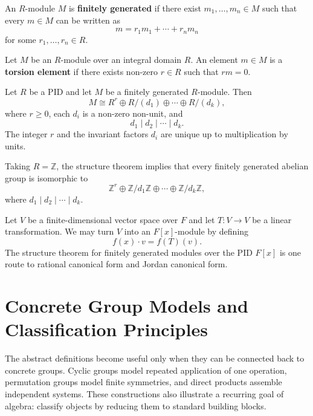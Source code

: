 \begin{definition}
An $R$-module $M$ is \textbf{finitely generated} if there exist $m_1,\dots,m_n\in M$ such that every $m\in M$ can be written as
\[
    m=r_1m_1+\cdots+r_nm_n
\]
for some $r_1,\dots,r_n\in R$.
\end{definition}

\begin{definition}
Let $M$ be an $R$-module over an integral domain $R$. An element $m\in M$ is a \textbf{torsion element} if there exists non-zero $r\in R$ such that $rm=0$.
\end{definition}

\begin{theorem}
Let $R$ be a PID and let $M$ be a finitely generated $R$-module. Then
\[
    M\cong R^r\oplus R/(d_1)\oplus\cdots\oplus R/(d_k),
\]
where $r\geq 0$, each $d_i$ is a non-zero non-unit, and
\[
    d_1\mid d_2\mid\cdots\mid d_k.
\]
The integer $r$ and the invariant factors $d_i$ are unique up to multiplication by units.
\end{theorem}

\begin{example}
Taking $R=\mathbb{Z}$, the structure theorem implies that every finitely generated abelian group is isomorphic to
\[
    \mathbb{Z}^r\oplus \mathbb{Z}/d_1\mathbb{Z}\oplus\cdots\oplus\mathbb{Z}/d_k\mathbb{Z},
\]
where $d_1\mid d_2\mid\cdots\mid d_k$.
\end{example}

\begin{example}
Let $V$ be a finite-dimensional vector space over $F$ and let $T:V\to V$ be a linear transformation. We may turn $V$ into an $F[x]$-module by defining
\[
    f(x)\cdot v=f(T)(v).
\]
The structure theorem for finitely generated modules over the PID $F[x]$ is one route to rational canonical form and Jordan canonical form.
\end{example}


\section{Concrete Group Models and Classification Principles}

The abstract definitions become useful only when they can be connected back to concrete groups. Cyclic groups model repeated application of one operation, permutation groups model finite symmetries, and direct products assemble independent systems. These constructions also illustrate a recurring goal of algebra: classify objects by reducing them to standard building blocks.

